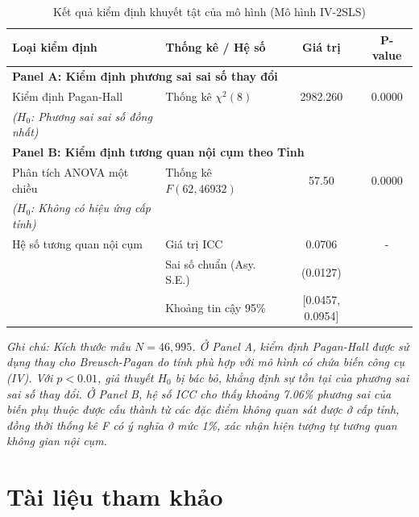 \documentclass[12pt,a4paper]{article}
\begin{document}
	\begin{table}[htbp]
		\centering
		\caption{Kết quả kiểm định khuyết tật của mô hình (Mô hình IV-2SLS)}
		\label{tab:diagnostics}
		\begin{tabular}{llcc}
			\toprule
			\textbf{Loại kiểm định} & \textbf{Thống kê / Hệ số} & \textbf{Giá trị} & \textbf{P-value} \\
			\midrule
			\multicolumn{4}{l}{\textbf{Panel A: Kiểm định phương sai sai số thay đổi}} \\
			Kiểm định Pagan-Hall & Thống kê $\chi^2(8)$ & 2982.260 & 0.0000 \\
			\textit{($H_0$: Phương sai sai số đồng nhất)} & & & \\
			\midrule
			\multicolumn{4}{l}{\textbf{Panel B: Kiểm định tương quan nội cụm theo Tỉnh}} \\
			Phân tích ANOVA một chiều & Thống kê $F(62, 46932)$ & 57.50 & 0.0000 \\
			\textit{($H_0$: Không có hiệu ứng cấp tỉnh)} & & & \\
			\addlinespace
			Hệ số tương quan nội cụm & Giá trị ICC & 0.0706 & - \\
			& Sai số chuẩn (Asy. S.E.) & (0.0127) & \\
			& Khoảng tin cậy 95\% & [0.0457, 0.0954] & \\
			\bottomrule
		\end{tabular}
		
		\vspace{1ex}
		\raggedright \textit{\small Ghi chú: Kích thước mẫu $N = 46,995$. Ở Panel A, kiểm định Pagan-Hall được sử dụng thay cho Breusch-Pagan do tính phù hợp với mô hình có chứa biến công cụ (IV). Với $p < 0.01$, giả thuyết $H_0$ bị bác bỏ, khẳng định sự tồn tại của phương sai sai số thay đổi. Ở Panel B, hệ số ICC cho thấy khoảng 7.06\% phương sai của biến phụ thuộc được cấu thành từ các đặc điểm không quan sát được ở cấp tỉnh, đồng thời thống kê F có ý nghĩa ở mức 1\%, xác nhận hiện tượng tự tương quan không gian nội cụm.}
	\end{table}
	
\newpage
\section*{Tài liệu tham khảo}
\printbibliography[heading=none, title={}]
\renewcommand{\bibfont}{\small}
\end{document}
